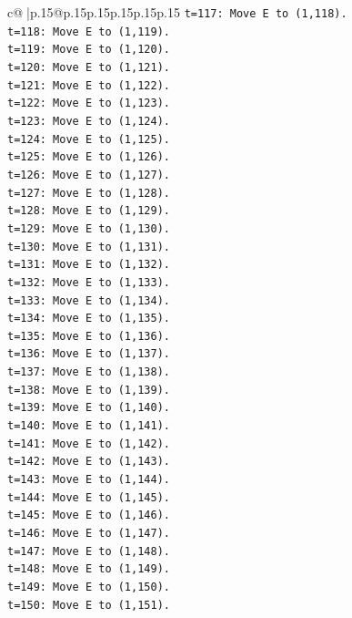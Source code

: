 \documentclass{article}
\begin{document}
{\begin{supertabular}{c@{$\;$}|p{.15\linewidth}@{}p{.15\linewidth}p{.15\linewidth}p{.15\linewidth}p{.15\linewidth}p{.15\linewidth}}
{{{\texttt{t=117: Move E to (1,118).} \\
\texttt{t=118: Move E to (1,119).} \\
\texttt{t=119: Move E to (1,120).} \\
\texttt{t=120: Move E to (1,121).} \\
\texttt{t=121: Move E to (1,122).} \\
\texttt{t=122: Move E to (1,123).} \\
\texttt{t=123: Move E to (1,124).} \\
\texttt{t=124: Move E to (1,125).} \\
\texttt{t=125: Move E to (1,126).} \\
\texttt{t=126: Move E to (1,127).} \\
\texttt{t=127: Move E to (1,128).} \\
\texttt{t=128: Move E to (1,129).} \\
\texttt{t=129: Move E to (1,130).} \\
\texttt{t=130: Move E to (1,131).} \\
\texttt{t=131: Move E to (1,132).} \\
\texttt{t=132: Move E to (1,133).} \\
\texttt{t=133: Move E to (1,134).} \\
\texttt{t=134: Move E to (1,135).} \\
\texttt{t=135: Move E to (1,136).} \\
\texttt{t=136: Move E to (1,137).} \\
\texttt{t=137: Move E to (1,138).} \\
\texttt{t=138: Move E to (1,139).} \\
\texttt{t=139: Move E to (1,140).} \\
\texttt{t=140: Move E to (1,141).} \\
\texttt{t=141: Move E to (1,142).} \\
\texttt{t=142: Move E to (1,143).} \\
\texttt{t=143: Move E to (1,144).} \\
\texttt{t=144: Move E to (1,145).} \\
\texttt{t=145: Move E to (1,146).} \\
\texttt{t=146: Move E to (1,147).} \\
\texttt{t=147: Move E to (1,148).} \\
\texttt{t=148: Move E to (1,149).} \\
\texttt{t=149: Move E to (1,150).} \\
\texttt{t=150: Move E to (1,151).} \\
}}}
\end{supertabular}}
\end{document}
